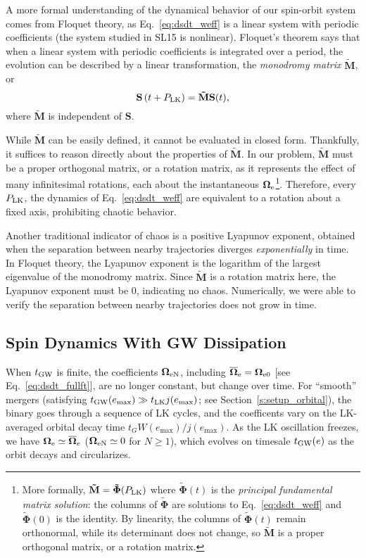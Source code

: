 \documentclass[
        twocolumn,
        twocolappendix
    ]{aastex63}
\renewcommand*{\bm}[1]{\boldsymbol{\mathbf{#1}}}
\newcommand*{\p}[1]{\left(#1\right)}
\begin{document}
A more formal understanding of the dynamical behavior of our spin-orbit system
comes from Floquet theory, as Eq.~\eqref{eq:dsdt_weff} is a linear system with
periodic coefficients (the system studied in SL15 is nonlinear). Floquet's
theorem says that when a linear system with periodic coefficients is integrated
over a period, the evolution can be described by a linear transformation, the
\emph{monodromy matrix} $\bm{\tilde{M}}$, or
\begin{equation}
    \bm{S}\p{t + P_{\rm LK}} = \bm{\tilde{M}} \bm{S}(t),
\end{equation}
where $\bm{\tilde{M}}$ is independent of $\bm{S}$.

While $\bm{\tilde{M}}$ can be easily defined, it cannot be evaluated in closed
form. Thankfully, it suffices to reason directly about the properties of
$\bm{\tilde{M}}$. In our problem, $\bm{\tilde{M}}$ must be a proper orthogonal
matrix, or a rotation matrix, as it represents the effect of many infinitesimal
rotations, each about the instantaneous $\bm{\Omega}_{\rm e}$\footnote{More
formally, $\bm{\tilde{M}} = \bm{\tilde{\Phi}}(P_{\rm LK})$ where
$\bm{\tilde{\Phi}}(t)$ is the \emph{principal fundamental matrix solution}: the
columns of $\bm{\tilde{\Phi}}$ are solutions to Eq.~\eqref{eq:dsdt_weff} and
$\bm{\tilde{\Phi}}(0)$ is the identity. By linearity, the columns of
$\bm{\tilde{\Phi}}(t)$ remain orthonormal, while its determinant does not
change, so $\bm{\tilde{M}}$ is a proper orthogonal matrix, or a rotation
matrix.}. Therefore, every $P_{\rm LK}$, the dynamics of
Eq.~\eqref{eq:dsdt_weff} are equivalent to a rotation about a fixed axis,
prohibiting chaotic behavior.

Another traditional indicator of chaos is a positive Lyapunov exponent, obtained
when the separation between nearby trajectories diverges \emph{exponentially} in
time. In Floquet theory, the Lyapunov exponent is the logarithm of the largest
eigenvalue of the monodromy matrix. Since $\bm{\tilde{M}}$ is a rotation matrix
here, the Lyapunov exponent must be $0$, indicating no chaos. Numerically, we
were able to verify the separation between nearby trajectories does not grow in
time.

\subsection{Spin Dynamics With GW Dissipation}

When $t_{\rm GW}$ is finite, the coefficients $\bm{\Omega}_{\rm eN}$, including
$\bm{\overline{\Omega}}_{\rm e} = \bm{\Omega}_{\rm e0}$ [see
Eq.~\eqref{eq:dsdt_fullft}], are no longer constant, but change over time. For
``smooth'' mergers (satisfying $t_{\rm GW}(e_{\max}) \gg t_{\rm LK}
j(e_{\max})$; see Section~\ref{s:setup_orbital}), the binary goes through a
sequence of LK cycles, and the coefficents vary on the LK-averaged orbital decay
time $t_GW(e_{\max}) / j(e_{\max})$. As the LK oscillation freezes, we have
$\bm{\Omega}_{\rm e} \simeq \bm{\overline{\Omega}}_e$ ($\bm{\Omega}_{\rm eN}
\simeq 0$ for $N \geq 1$), which evolves on timesale $t_{\rm GW}(e)$ as the
orbit decays and circularizes.
\end{document}
